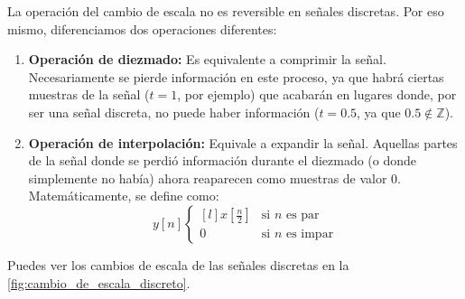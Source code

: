 \documentclass[a4paper]{book}
\begin{document}
La operación del cambio de escala no es reversible en señales discretas. Por eso mismo, diferenciamos dos operaciones diferentes:
\begin{enumerate}
	\item \textbf{Operación de diezmado:} Es equivalente a comprimir la señal. Necesariamente se pierde información en este proceso, ya que habrá ciertas muestras de la señal ($t=1$, por ejemplo) que acabarán en lugares donde, por ser una señal discreta, no puede haber información ($t=0.5$, ya que $0.5 \not \in \mathbb{Z}$).
	\item \textbf{Operación de interpolación:} Equivale a expandir la señal. Aquellas partes de la señal donde se perdió información durante el diezmado (o donde simplemente no había) ahora reaparecen como muestras de valor 0. Matemáticamente, se define como: \[y[n] \left\{ \begin{matrix*}[l]
			      x\left[ \frac{n}{2} \right] & \text{si } n \text{ es par} \\
			      0 & \text{si } n \text{ es impar}
		      \end{matrix*} \right. \]
\end{enumerate}

Puedes ver los cambios de escala de las señales discretas en la \autoref{fig:cambio_de_escala_discreto}.
\end{document}
